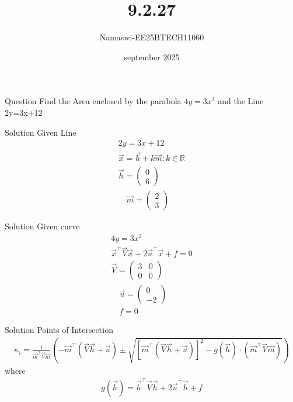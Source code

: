 \documentclass{beamer}
\begin{document}
\title 
{9.2.27}
\date{september 2025}


\author 
{Namaswi-EE25BTECH11060}
\frame{\titlepage}
\begin{frame}{Question}
Find the Area enclosed by the parabola $4y=3x^2$ and the Line 2y=3x+12
\end{frame}
 \begin{frame}{Solution}
     Given Line 
\begin{align}
2y=3x+12\\
\vec{x}=\vec{h}+k\vec{m} ; k \in \mathbb{R}\\
\vec{h} = \begin{pmatrix} 0 \\ 6 \end{pmatrix}\\ \quad 
\vec{m} = \begin{pmatrix} 2 \\ 3 \end{pmatrix}
\end{align}
 \end{frame}
 \begin{frame}{Solution}
     Given curve
\begin{align}
    4y=3 x^2\\
    \vec{x}^\top \vec{V} \vec{x} + 2\vec{u}^\top \vec{x} + f = 0\\
    \vec{V} = \begin{pmatrix} 3 & 0 \\ 0 & 0 \end{pmatrix}\\ \quad
\vec{u} = \begin{pmatrix} 0 \\ -2 \end{pmatrix} \\ \quad
f = 0
\end{align}
 \end{frame}
 \begin{frame}{Solution}
     Points of Intersection\\
\begin{align}
    \kappa_i = \frac{1}{\vec{m}^\top \vec{V} \vec{m}} 
\left( -\vec{m}^\top (\vec{V}\vec{h} + \vec{u}) 
\pm \sqrt{ \left[ \vec{m}^\top (\vec{V}\vec{h} + \vec{u}) \right]^2 
- g(\vec{h}) \cdot (\vec{m}^\top \vec{V} \vec{m}) } \right)
\end{align}
where
\begin{align}
    g(\vec{h}) = \vec{h}^\top \vec{V} \vec{h} 
+ 2\vec{u}^\top \vec{h} + f\\
\end{align}
 \end{frame}
\end{document}
